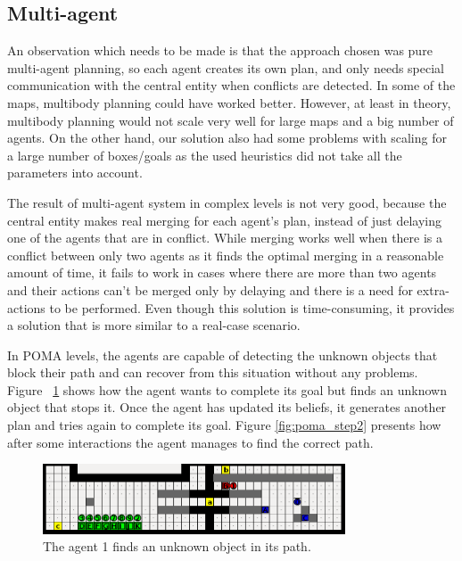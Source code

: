 \subsection{Multi-agent} %
An observation which needs to be made is that the approach chosen was pure multi-agent planning, so each agent
creates its own plan, and only needs special communication with the central entity when conflicts are
detected. In some of the maps, multibody planning could have worked better. However, at least in theory,
multibody planning would not scale very well for large maps and a big number of agents. On the other hand, our
solution also had some problems with scaling for a large number of boxes/goals as the used heuristics did not
take all the parameters into account.

The result of multi-agent system in complex levels is not very good, because the central entity makes real
merging for each agent's plan, instead of just delaying one of the agents that are in conflict. While merging
works well when there is a conflict between only two agents as it finds the optimal merging in a reasonable
amount of time, it fails to work in cases where there are more than two agents and their actions can’t be
merged only by delaying and there is a need for extra-actions to be performed. Even though this solution is
time-consuming, it provides a solution that is more similar to a real-case scenario.

In POMA levels, the agents are capable of detecting the unknown objects that block their path and can recover
from this situation without any problems. Figure ~\ref{fig:poma_step1} shows how the agent wants to complete
its goal but finds an unknown object that stops it. Once the agent has updated its beliefs, it generates
another plan and tries again to complete its goal. Figure \ref{fig:poma_step2} presents how after some
interactions the agent manages to find the correct path.

\begin{figure}[htb]

\begin{center}

\includegraphics[width=0.8\textwidth]{figures/POMA_step1}

\caption{The agent 1 finds an unknown object in its path.}

\label{fig:poma_step1}

\end{center}

\end{figure}

